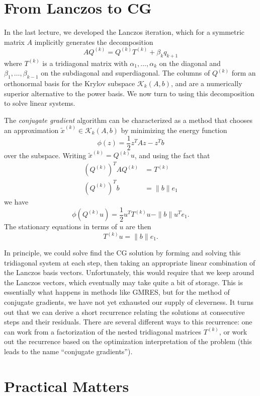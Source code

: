 \documentclass[12pt, leqno]{article}
\newcommand{\calK}{\mathcal{K}}
\begin{document}

\section*{From Lanczos to CG}

In the last lecture, we developed the Lanczos iteration, which
for a symmetric matrix $A$ implicitly generates the decomposition
\[
  A Q^{(k)} = Q^{(k)} T^{(k)} + \beta_k q_{k+1}
\]
where $T^{(k)}$ is a tridiagonal matrix with $\alpha_1, \ldots,
\alpha_k$ on the diagonal and $\beta_1, \ldots, \beta_{k-1}$ on
the subdiagonal and superdiagonal.  The columns of $Q^{(k)}$ form
an orthonormal basis for the Krylov subspace $\calK_{k}(A,b)$,
and are a numerically superior alternative to the power basis.
We now turn to using this decomposition to solve linear systems.

The {\em conjugate gradient} algorithm can be characterized as
a method that chooses an approximation
$\tilde{x}^{(k)} \in \calK_k(A,b)$ by minimizing the energy
function
\[
  \phi(z) = \frac{1}{2} z^T A z - z^T b
\]
over the subspace.  Writing $\tilde{x}^{(k)} = Q^{(k)} u$,
and using the fact that
\begin{align*}
  (Q^{(k)})^T A Q^{(k)} & = T^{(k)} \\
  (Q^{(k)})^T b &= \|b\| e_1
\end{align*}
we have
\[
  \phi(Q^{(k)} u) = \frac{1}{2} u^T T^{(k)} u - \|b\| u^T e_1.
\]
The stationary equations in terms of $u$ are then
\[
  T^{(k)} u = \|b\| e_1.
\]

In principle, we could solve find the CG solution by forming and
solving this tridiagonal system at each step, then taking an
appropriate linear combination of the Lanczos basis vectors.
Unfortunately, this would require that we keep around the Lanczos
vectors, which eventually may take quite a bit of storage.
This is essentially what happens in methods like GMRES, but
for the method of conjugate gradients, we have not yet exhausted
our supply of cleverness.  It turns out that we can derive a short
recurrence relating the solutions at consecutive steps and their
residuals.  There are several different ways to this recurrence:
one can work from a factorization of the nested tridiagonal matrices
$T^{(k)}$, or work out the recurrence based on the optimization
interpretation of the problem (this leads to the name ``conjugate
gradients'').

\section*{Practical Matters}
\end{document}
